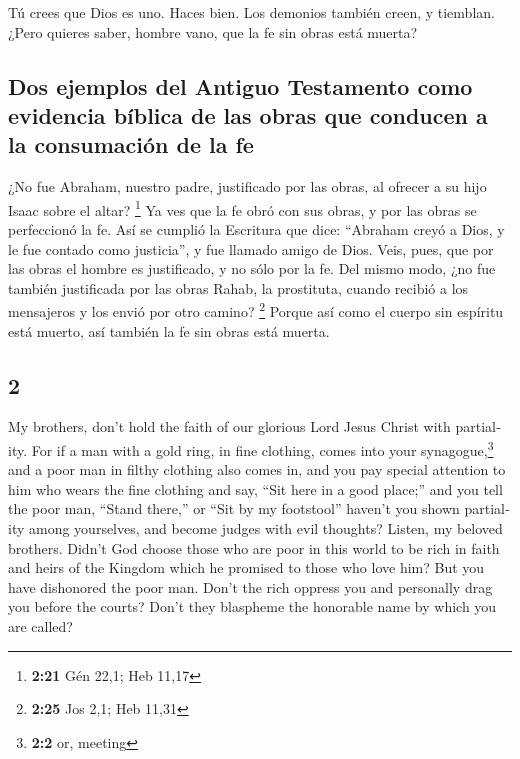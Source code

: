 \begin{paracol}{2}
 Tú crees que Dios es uno. Haces bien. Los demonios
también creen, y tiemblan.  ¿Pero quieres saber, hombre
vano, que la fe sin obras está muerta?

\hypertarget{dos-ejemplos-del-antiguo-testamento-como-evidencia-buxedblica-de-las-obras-que-conducen-a-la-consumaciuxf3n-de-la-fe}{%
\subsection{Dos ejemplos del Antiguo Testamento como evidencia bíblica
de las obras que conducen a la consumación de la
fe}\label{dos-ejemplos-del-antiguo-testamento-como-evidencia-buxedblica-de-las-obras-que-conducen-a-la-consumaciuxf3n-de-la-fe}}

 ¿No fue Abraham, nuestro padre, justificado por las
obras, al ofrecer a su hijo Isaac sobre el altar? \footnote{\textbf{2:21}
  Gén 22,1; Heb 11,17}  Ya ves que la fe obró con sus
obras, y por las obras se perfeccionó la fe.  Así se
cumplió la Escritura que dice: ``Abraham creyó a Dios, y le fue contado
como justicia'', y fue llamado amigo de Dios.  Veis,
pues, que por las obras el hombre es justificado, y no sólo por la fe.
 Del mismo modo, ¿no fue también justificada por las
obras Rahab, la prostituta, cuando recibió a los mensajeros y los envió
por otro camino? \footnote{\textbf{2:25} Jos 2,1; Heb 11,31}
 Porque así como el cuerpo sin espíritu está muerto, así
también la fe sin obras está muerta.

\switchcolumn
\begin{otherlanguage}{english}

\hypertarget{section-3}{%
\section{2}\label{section-3}}

 My brothers, don't hold the faith of our glorious Lord
Jesus Christ with partiality.  For if a man with a gold
ring, in fine clothing, comes into your synagogue,\footnote{\textbf{2:2}
  or, meeting} and a poor man in filthy clothing also comes in,
 and you pay special attention to him who wears the fine
clothing and say, ``Sit here in a good place;'' and you tell the poor
man, ``Stand there,'' or ``Sit by my footstool''  haven't
you shown partiality among yourselves, and become judges with evil
thoughts?  Listen, my beloved brothers. Didn't God choose
those who are poor in this world to be rich in faith and heirs of the
Kingdom which he promised to those who love him?  But you
have dishonored the poor man. Don't the rich oppress you and personally
drag you before the courts?  Don't they blaspheme the
honorable name by which you are called?


\end{otherlanguage}
\end{paracol}
